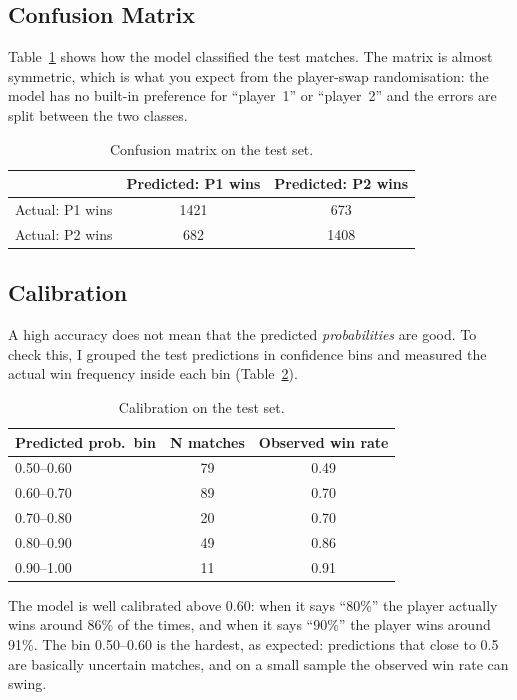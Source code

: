 \documentclass[10pt,twocolumn]{article}
\begin{document}
\subsection{Confusion Matrix}
Table~\ref{tab:cm} shows how the model classified the test matches.
The matrix is almost symmetric, which is what you expect from the
player-swap randomisation: the model has no built-in preference for
``player~1'' or ``player~2'' and the errors are split between the
two classes.

\begin{table}[t]
\centering
\caption{Confusion matrix on the test set.}
\label{tab:cm}
\begin{tabular}{lcc}
\toprule
 & Predicted: P1 wins & Predicted: P2 wins \\
\midrule
Actual: P1 wins & \num{1421} & \num{673} \\
Actual: P2 wins & \num{682}  & \num{1408} \\
\bottomrule
\end{tabular}
\end{table}

\subsection{Calibration}
A high accuracy does not mean that the predicted \emph{probabilities}
are good. To check this, I grouped the test predictions in confidence
bins and measured the actual win frequency inside each bin
(Table~\ref{tab:cal}).

\begin{table}[t]
\centering
\caption{Calibration on the test set.}
\label{tab:cal}
\begin{tabular}{lcc}
\toprule
Predicted prob.\ bin & N matches & Observed win rate \\
\midrule
0.50--0.60 & 79  & 0.49 \\
0.60--0.70 & 89  & 0.70 \\
0.70--0.80 & 20  & 0.70 \\
0.80--0.90 & 49  & 0.86 \\
0.90--1.00 & 11  & 0.91 \\
\bottomrule
\end{tabular}
\end{table}

The model is well calibrated above 0.60: when it says ``80\%'' the
player actually wins around 86\% of the times, and when it says ``90\%''
the player wins around 91\%. The bin 0.50--0.60 is the hardest, as
expected: predictions that close to 0.5 are basically uncertain
matches, and on a small sample the observed win rate can swing.
\end{document}
